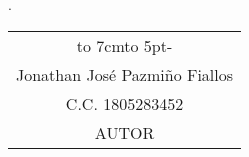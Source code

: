 \newpage
{}
\begin{flushright}
	\lugarFechaPrelims.
\end{flushright}

\vspace*{5cm}
\begin{center}
	\begin{tabular}{c}
		\hbox to 7cm{\leaders\hbox to 5pt{\hss - \hss}\hfil} \\
		Jonathan José Pazmiño Fiallos                        \\
		C.C. 1805283452                                      \\
		AUTOR
	\end{tabular}
\end{center}
